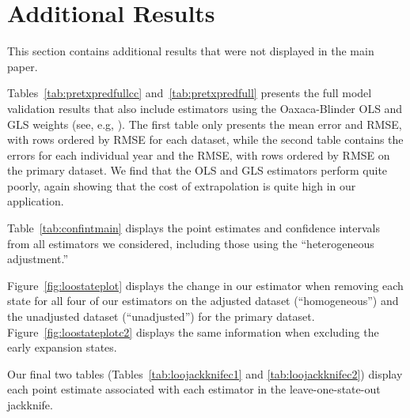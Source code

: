 \section{Additional Results}\label{app:allresults}

This section contains additional results that were not displayed in the main paper.

Tables~\ref{tab:pretxpredfullcc} and~\ref{tab:pretxpredfull} presents the full model validation results that also include estimators using the Oaxaca-Blinder OLS and GLS weights (see, e.g, \cite{kline2011oaxaca}). The first table only presents the mean error and RMSE, with rows ordered by RMSE for each dataset, while the second table contains the errors for each individual year and the RMSE, with rows ordered by RMSE on the primary dataset. We find that the OLS and GLS estimators perform quite poorly, again showing that the cost of extrapolation is quite high in our application. 

Table~\ref{tab:confintmain} displays the point estimates and confidence intervals from all estimators we considered, including those using the ``heterogeneous adjustment.''

Figure~\ref{fig:loostateplot} displays the change in our estimator when removing each state for all four of our estimators on the adjusted dataset (``homogeneous'') and the unadjusted dataset (``unadjusted'') for the primary dataset. Figure~\ref{fig:loostateplotc2} displays the same information when excluding the early expansion states. 

Our final two tables (Tables~\ref{tab:loojackknifec1} and \ref{tab:loojackknifec2}) display each point estimate associated with each estimator in the leave-one-state-out jackknife.

